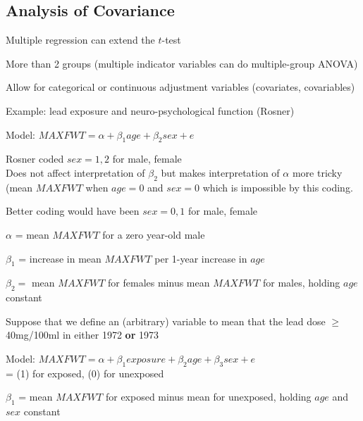 \subsection{Analysis of Covariance}
\bi
\item Multiple regression can extend the $t$-test
 \bi
 \item More than 2 groups (multiple indicator variables can do
   multiple-group ANOVA)
 \item Allow for categorical or continuous adjustment variables
   (covariates, covariables)
 \ei
\item Example: lead exposure and neuro-psychological function (Rosner)
\item Model: $MAXFWT = \alpha + \beta_{1} age + \beta_{2} sex + e$
\item Rosner coded $sex=1, 2$ for male, female \\
  Does not affect interpretation of $\beta_2$ but makes interpretation
  of $\alpha$ more tricky (mean $MAXFWT$ when $age=0$ and $sex=0$
  which is impossible by this coding.
\item Better coding would have been $sex=0, 1$ for male, female
 \bi
 \item $\alpha$ = mean $MAXFWT$ for a zero year-old male
 \item $\beta_{1}$ = increase in mean $MAXFWT$ per 1-year increase in
   $age$
 \item $\beta_{2} =$ mean $MAXFWT$ for females minus mean $MAXFWT$ for
   males, holding $age$ constant
 \ei
\item Suppose that we define an (arbitrary)  variable to \ipacue
  mean that the lead dose $\geq$ 40mg/100ml in either 1972 \textbf{or} 1973
\item Model: $MAXFWT = \alpha + \beta_{1} exposure + \beta_{2} age +
  \beta_{3} sex + e$ \\
  =  (1) for exposed,  (0) for unexposed
\item $\beta_{1}$ = mean $MAXFWT$ for exposed minus mean for
  unexposed, holding $age$ and $sex$ constant
\ei

